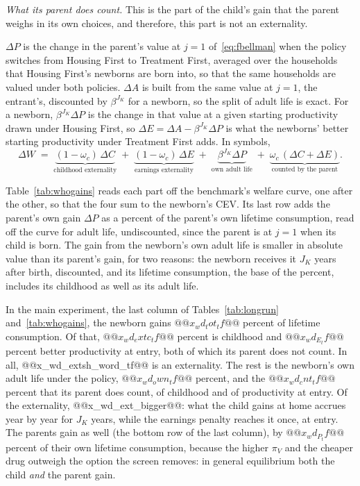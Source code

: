 \documentclass[10pt]{article}
\begin{document}
\emph{What its parent does count.}   This is the part of the child's gain that the parent weighs in its own choices, and therefore, this part is not an externality.

$\Delta P$ is the change in the parent's value at $j=1$ of~\eqref{eq:fbellman} when the policy switches from Housing First to Treatment First, averaged over the households that Housing First's newborns are born into, so that the same households are valued under both policies. $\Delta A$ is built from the same value at $j=1$, the entrant's, discounted by $\beta^{J_K}$ for a newborn, so the split of adult life is exact. For a newborn, $\beta^{J_K}\Delta P$ is the change in that value at a given starting productivity drawn under Housing First, so $\Delta E$$=\Delta A-\beta^{J_K}\Delta P$ is what the newborns' better starting productivity under Treatment First adds. In symbols,
\begin{equation}\label{eq:parts}
\Delta W\;=\;\underbrace{(1-\omega_c)\,\Delta C}_{\text{childhood externality}}\;+\;\underbrace{(1-\omega_c)\,\Delta E}_{\text{earnings externality}}\;+\;\underbrace{\beta^{J_K}\Delta P}_{\text{own adult life}}\;+\;\underbrace{\omega_c\,(\Delta C+\Delta E)}_{\text{counted by the parent}}.
\end{equation}

Table~\ref{tab:whogains} reads each part off the benchmark's welfare curve, one after the other, so that the four sum to the newborn's CEV. Its last row adds the parent's own gain $\Delta P$ as a percent of the parent's own lifetime consumption, read off the curve for adult life, undiscounted, since the parent is at $j=1$ when its child is born. The gain from the newborn's own adult life is smaller in absolute value than its parent's gain, for two reasons: the newborn receives it $J_K$ years after birth, discounted, and its lifetime consumption, the base of the percent, includes its childhood as well as its adult life.



In the main experiment, the last column of Tables~\ref{tab:longrun} and~\ref{tab:whogains}, the newborn gains $@@x_wd_tot_tf@@$ percent of lifetime consumption. Of that, $@@x_wd_extc_tf@@$ percent is childhood and $@@x_wd_E_tf@@$ percent better productivity at entry, both of which its parent does not count. In all, @@x_wd_extsh_word_tf@@ is an externality. The rest is the newborn's own adult life under the policy, $@@x_wd_own_tf@@$ percent, and the $@@x_wd_cnt_tf@@$ percent that its parent does count, of childhood and of productivity at entry. Of the externality, @@x_wd_ext_bigger@@: what the child gains at home accrues year by year for $J_K$ years, while the earnings penalty reaches it once, at entry. The parents gain as well (the bottom row of the last column), by $@@x_wd_P_tf@@$ percent of their own lifetime consumption, because the higher $\pi_V$ and the cheaper drug outweigh the option the screen removes: in general equilibrium both the child \emph{and} the parent gain.
\end{document}
